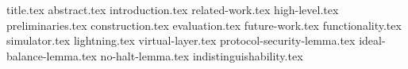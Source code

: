 \documentclass{llncs}
\begin{document}
\pagestyle{plain}

{title.tex}
{abstract.tex}
{introduction.tex}
{related-work.tex}
{high-level.tex}
{preliminaries.tex}
{construction.tex}
{evaluation.tex}
{future-work.tex}
{functionality.tex}
{simulator.tex}
{lightning.tex}
{virtual-layer.tex}
{protocol-security-lemma.tex}
{ideal-balance-lemma.tex}
{no-halt-lemma.tex}
{indistinguishability.tex}


\end{document}
